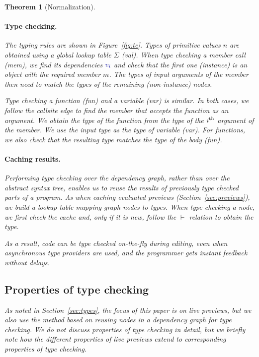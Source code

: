 \documentclass[acmsmall,anonymous,fleqn]{acmart}\settopmatter{printfolios=false,printccs=false,printacmref=false}
\newcounter{thc}
\theoremstyle{plain}
\newtheorem{theorem}[thc]{Theorem}
\theoremstyle{definition}
\newcommand{\bndclr}[1]{\textcolor{kvdclr}{#1}}
\newcommand{\blbl}[1]{\textnormal{\textcolor{numclr}{\sffamily #1}}}
\newcommand{\rname}[1]{{\sffamily\small(#1)}}
\begin{document}
\begin{theorem}[Normalization]
\paragraph{Type checking.}
The typing rules are shown in Figure~\ref{fig:tc}. Types of primitive values $n$ are obtained
using a global lookup table $\Sigma$ \rname{val}. When type checking a member call \rname{mem},
we find its dependencies $\bndclr{v_i}$ and check that the first one (instance) is an object with
the required member $m$. The types of input arguments of the member then need to match the types
of the remaining (non-instance) nodes.

Type checking a function \rname{fun} and a variable \rname{var} is similar. In both cases,
we follow the \blbl{callsite} edge to find the member that accepts the function as an argument.
We obtain the type of the function from the type of the $i^\textnormal{th}$ argument of the
member. We use the input type as the type of variable \rname{var}. For functions, we also check
that the resulting type matches the type of the body \rname{fun}.

\paragraph{Caching results.}
Performing type checking over the dependency graph, rather than over the abstract syntax tree,
enables us to reuse the results of previously type checked parts of a program. As when
caching evaluated previews (Section~\ref{sec:previews}), we build a lookup table mapping graph
nodes to types. When type checking a node, we first check the cache and, only if it is new,
follow the $\vdash$ relation to obtain the type.

As a result, code can be type checked on-the-fly during editing, even when asynchronous type
providers are used, and the programmer gets instant feedback without delays.


\subsection{Properties of type checking}

As noted in Section~\ref{sec:types}, the focus of this paper is on live previews, but we also
use the method based on reusing nodes in a dependency graph for type checking. We do not discuss
properties of type checking in detail, but we briefly note how the different properties of
live previews extend to corresponding properties of type checking.


\end{theorem}
\end{document}
